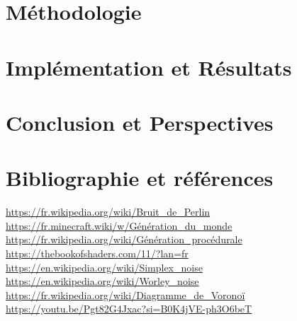 \documentclass{article}
\begin{document}
\section{Méthodologie}

\section{Implémentation et Résultats}
\label{Implémentation}
\section{Conclusion et Perspectives}

\section{Bibliographie et références}
\url{https://fr.wikipedia.org/wiki/Bruit_de_Perlin}\\
\url{https://fr.minecraft.wiki/w/Génération_du_monde}\\
\url{https://fr.wikipedia.org/wiki/Génération_procédurale}\\
\url{https://thebookofshaders.com/11/?lan=fr}\\
\url{https://en.wikipedia.org/wiki/Simplex_noise}\\
\url{https://en.wikipedia.org/wiki/Worley_noise}\\
\url{https://fr.wikipedia.org/wiki/Diagramme_de_Voronoï}\\
\url{https://youtu.be/Pgt82G4Jxac?si=B0K4jVE-ph3O6beT}
\end{document}
